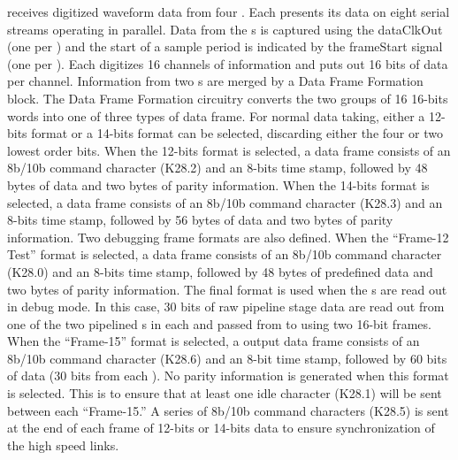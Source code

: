  receives digitized waveform data from 
four  . Each  presents its data on eight 
serial streams operating in parallel. Data from the s is captured 
using the  dataClkOut (one per ) and the start of a 
sample period is indicated by the frameStart signal (one per ). 
Each  digitizes 16 channels of information and puts out 16 bits 
of data per channel. Information from two s are merged by a Data 
Frame Formation block. The Data Frame Formation circuitry converts the two 
groups of 16 16-bits words into one of three types of data frame. For normal 
data taking, either a 12-bits format or a 14-bits  format can be 
selected, discarding either the four or two lowest order bits. When the 
12-bits format is selected, a data frame consists of an 8b/10b command 
character (K28.2) and an 8-bits time stamp, followed by 48 bytes of  
data and two bytes of parity information. When the 14-bits format is selected, 
a data frame consists of an 8b/10b command character (K28.3) and an 8-bits time 
stamp, followed by 56 bytes of  data and two bytes of parity 
information. Two debugging frame formats are also defined. When the ``Frame-12 Test'' 
format is selected, a data frame consists of an 8b/10b command character 
(K28.0) and an 8-bits time stamp, followed by 48 bytes of predefined data 
and two bytes of parity information. The final format is used when the 
s are read out in debug mode. In this case, 30 bits of raw 
pipeline stage data are read out from one of the two pipelined s 
in each   and passed from  to 
 using two 16-bit frames. When the ``Frame-15'' format is 
selected, a  output data frame consists of an 8b/10b command 
character (K28.6) and an 8-bit time stamp, followed by 60 bits of  
data (30 bits from each ). No parity information is generated 
when this format is selected. This is to ensure that at least one idle 
character (K28.1) will be sent between each ``Frame-15.'' A series of 8b/10b 
command characters (K28.5) is sent at the end of each frame of 12-bits or 
14-bits data to ensure synchronization of the high speed links.

